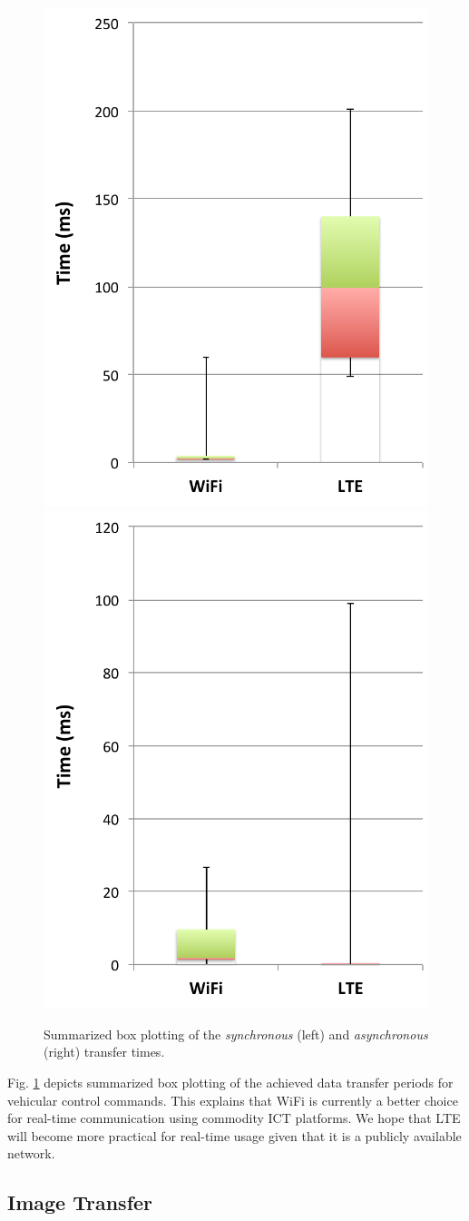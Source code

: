 \begin{figure}[!t]
 \centering
 \includegraphics[width=0.45\hsize]{fig/No3_Andrive_boxplot_compare_WiFi_and_LTE.pdf}
 \includegraphics[width=0.45\hsize]{fig/No7_Andrive_only_send_boxplot_compare_WiFi_and_LTE.pdf}
 \caption{Summarized box plotting of the \textit{synchronous} (left) and
 \textit{asynchronous} (right) transfer times.}
 \label{fig:no3_7}
\end{figure}

Fig. \ref{fig:no3_7} depicts summarized box plotting of the achieved
data transfer periods for vehicular control commands.
This explains that WiFi is currently a better choice for real-time
communication using commodity ICT platforms.
We hope that LTE will become more practical for real-time usage given
that it is a publicly available network.

\subsection{Image Transfer}

